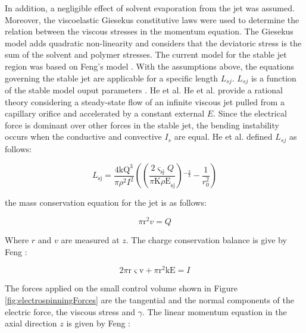 In addition, a negligible effect of solvent evaporation from the jet was assumed. Moreover, the viscoelastic Giesekus constitutive laws \cite{Hinch} were used to determine the relation between the viscous stresses in the momentum equation. The Giesekus model adds quadratic non-linearity and considers that the deviatoric stress is the sum of the solvent and polymer stresses. The current model for the stable jet region was based on Feng's model \cite{Feng2002}. With the assumptions above, the equations governing the stable jet are applicable for a specific length $L_{sj}$. $L_{sj}$ is a function of the stable model ouput parameters \cite{He2007}. He et al. He et al. \cite{He2007} provide a rational theory considering a steady-state flow of an infinite viscous jet pulled from a capillary orifice and accelerated by a constant external $E$. Since the electrical force is dominant over other forces in the stable jet, the bending instability occurs when the conductive and convective $I_{s}$ are equal. He et al. \cite{He2007} defined $L_{sj}$ as follows:

\begin{equation}
L_{\text{sj}}=\frac{4 \text{kQ}^3}{\pi \rho ^2 I^2}\left(\left(\frac{2 \varsigma_{\text{sj}}
   Q}{\text{$\pi $K$\rho $E}_{\text{sj}}}\right){}^{-\frac{2}{3}}-\frac{1}{r_0^2}\right)
\label{eq:specificLength}
\end{equation}

the mass conservation equation for the jet is as follows:

\begin{equation}
\text{$\pi $r}^2 v=Q
\label{eq:massConservation}
\end{equation}

Where $r$ and $v$ are measured at $z$. The charge conservation balance is give by Feng \cite{Feng2002}:

\begin{equation}
2 \text{$\pi $r$\varsigma$v}+\text{$\pi $r}^2 \text{kE}=I
\label{eq:chargeConservation}
\end{equation}

The forces applied on the small control volume shown in Figure \ref{fig:electrospinningForces} are the tangential and the normal components of the electric force, the viscous stress and $\gamma$. The linear momentum equation in the axial direction $z$ is given by Feng \cite{Feng2002}:

